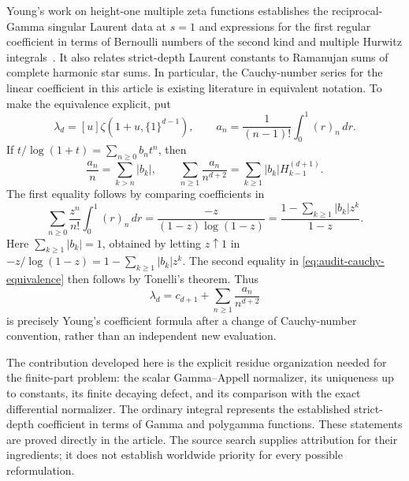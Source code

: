 \documentclass[11pt,a4paper]{article}
\numberwithin{equation}{section}
\theoremstyle{definition}
\begin{document}
Young's work on height-one multiple zeta functions establishes
the reciprocal-Gamma singular Laurent data at $s=1$ and
expressions for the first regular coefficient in terms of
Bernoulli numbers of the second kind and multiple Hurwitz
integrals~\cite{Young2023,Young2024,YoungLecture}.  It also relates
strict-depth Laurent constants to Ramanujan sums of complete
harmonic star sums.  In particular, the Cauchy-number series
for the linear coefficient in this article is existing
literature in equivalent notation.  To make the equivalence
explicit, put
\begin{equation}
 \lambda_d=[u]\zeta(1+u,\{1\}^{d-1}),\qquad
 a_n=\frac{1}{(n-1)!}\int_0^1(r)_n\,dr.
 \label{eq:audit-lambda-and-cauchy}
\end{equation}
If $t/\log(1+t)=\sum_{n\geq0}b_nt^n$, then
\begin{equation}
 \frac{a_n}{n}=\sum_{k>n}|b_k|,\qquad
 \sum_{n\geq1}\frac{a_n}{n^{d+2}}
      =\sum_{k\geq1}|b_k|H_{k-1}^{(d+1)}.
 \label{eq:audit-cauchy-equivalence}
\end{equation}
The first equality follows by comparing coefficients in
\begin{equation}
 \sum_{n\geq0}\frac{z^n}{n!}\int_0^1(r)_n\,dr
   =\frac{-z}{(1-z)\log(1-z)}
   =\frac{1-\sum_{k\geq1}|b_k|z^k}{1-z}.
 \label{eq:audit-cauchy-generating-equivalence}
\end{equation}
Here $\sum_{k\geq1}|b_k|=1$, obtained by letting $z\uparrow1$
in $-z/\log(1-z)=1-\sum_{k\geq1}|b_k|z^k$.
The second equality in \eqref{eq:audit-cauchy-equivalence}
then follows by Tonelli's theorem.  Thus
\begin{equation}
 \lambda_d=c_{d+1}+\sum_{n\geq1}\frac{a_n}{n^{d+2}}
 \label{eq:audit-known-cauchy-coefficient}
\end{equation}
is precisely Young's coefficient formula after a change of
Cauchy-number convention, rather than an independent new evaluation.

The contribution developed here is the explicit residue organization
needed for the finite-part problem: the scalar Gamma--Appell
normalizer, its uniqueness up to constants, its finite decaying
defect, and its comparison with the exact differential normalizer.
The ordinary integral represents the established strict-depth
coefficient in terms of Gamma and polygamma functions.
These statements are proved directly in the article.  The source
search supplies attribution for their ingredients; it does not
establish worldwide priority for every possible reformulation.
\end{document}
